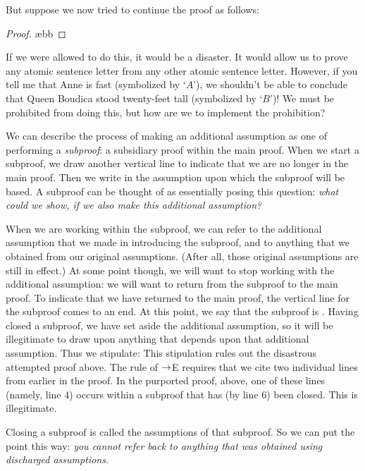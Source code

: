 But suppose we now tried to continue the proof as follows:
\begin{proof}
	\open
		 \ae{bb}
	\close
\end{proof}
If we were allowed to do this, it would be a disaster. It would allow us to prove any atomic sentence letter from any other atomic sentence letter. However, if you tell me that Anne is fast (symbolized by `$A$'), we shouldn't be able to conclude that Queen Boudica stood twenty-feet tall (symbolized by `$B$')! We must be prohibited from doing this, but how are we to implement the prohibition?

We can describe the process of making an additional assumption as one of performing a \emph{subproof}: a subsidiary proof within the main proof. When we start a subproof, we draw another vertical line to indicate that we are no longer in the main proof. Then we write in the assumption upon which the subproof will be based. A subproof can be thought of as essentially posing this question: \emph{what could we show, if we also make this additional assumption?}

When we are working within the subproof, we can refer to the additional assumption that we made in introducing the subproof, and to anything that we obtained from our original assumptions. (After all, those original assumptions are still in effect.) At some point though, we will want to stop working with the additional assumption: we will want to return from the subproof to the main proof. To indicate that we have returned to the main proof, the vertical line for the subproof comes to an end. At this point, we say that the subproof is . Having closed a subproof, we have set aside the additional assumption, so it will be illegitimate to draw upon anything that depends upon that additional assumption. Thus we stipulate:
This stipulation rules out the disastrous attempted proof above. The rule of $\rightarrow$E requires that we cite two individual lines from earlier in the proof. In the purported proof, above, one of these lines (namely, line 4) occurs within a subproof that has (by line 6) been closed. This is illegitimate. 

Closing a subproof is called  the assumptions of that subproof. So we can put the point this way: \emph{you cannot refer back to anything that was obtained using discharged assumptions}. 


